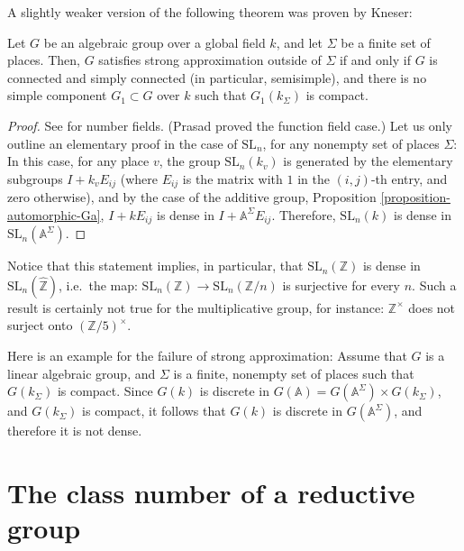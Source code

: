 A slightly weaker version of the following theorem was proven by Kneser:
\begin{theorem}
\label{theorem-strong-approximation}
 Let $G$ be an algebraic group over a global field $k$, and let $\Sigma$ be a finite set of places. Then, $G$ satisfies strong approximation outside of $\Sigma$ if and only if $G$ is connected and simply connected (in particular, semisimple), and there is no simple component $G_1\subset G$ over $k$ such that $G_1(k_\Sigma)$ is compact.
\end{theorem}

\begin{proof}
 See \cite[\S 7.4]{Platonov-Rapinchuk} for number fields. (Prasad proved the function field case.) Let us only outline an elementary proof in the case of $\text{SL}_n$, for any nonempty set of places $\Sigma$: In this case, for any place $v$, the group $\text{SL}_n(k_v)$ is generated by the elementary subgroups $I+ k_v E_{ij}$ (where $E_{ij}$ is the matrix with $1$ in the $(i,j)$-th entry, and zero otherwise), and by the case of the additive group, Proposition \ref{proposition-automorphic-Ga}, $I+kE_{ij}$ is dense in $I+ \mathbb A^\Sigma E_{ij}$. Therefore, $\text{SL}_n(k)$ is dense in $\text{SL}_n(\mathbb A^\Sigma)$. 
\end{proof}


Notice that this statement implies, in particular, that $\text{SL}_n(\mathbb Z)$ is dense in $\text{SL}_n(\widehat{\mathbb Z})$, i.e.\ the map: $\text{SL}_n(\mathbb Z)\to \text{SL}_n(\mathbb Z/n)$ is surjective for every $n$. Such a result is certainly not true for the multiplicative group, for instance: $\mathbb Z^\times$ does not surject onto $(\mathbb Z/5)^\times$.

\begin{example}
 \label{example-failure-strong-approximation}
Here is an example for the failure of strong approximation: Assume that $G$ is a linear algebraic group, and $\Sigma$ is a finite, nonempty set of places such that $G(k_\Sigma)$ is compact. Since $G(k)$ is discrete in $G(\mathbb A) = G(\mathbb A^\Sigma) \times G(k_\Sigma)$, and $G(k_\Sigma)$ is compact, it follows that $G(k)$ is discrete in  $G(\mathbb A^\Sigma)$, and therefore it is not dense.
\end{example}


\section{The class number of a reductive group}
\label{section-class-number}

